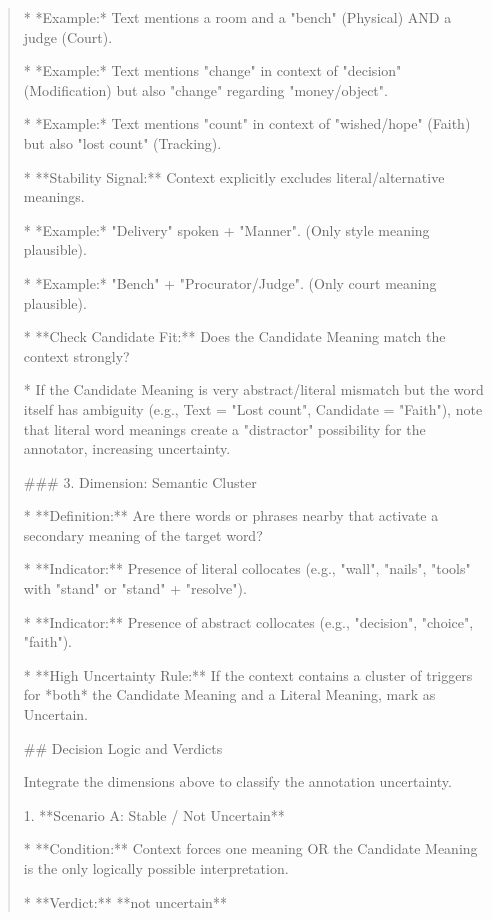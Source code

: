\begin{quote}
        *   *Example:* Text mentions a room and a "bench" (Physical) AND a judge (Court).

        *   *Example:* Text mentions "change" in context of "decision" (Modification) but also "change" regarding "money/object".

        *   *Example:* Text mentions "count" in context of "wished/hope" (Faith) but also "lost count" (Tracking).

    *   **Stability Signal:** Context explicitly excludes literal/alternative meanings.

        *   *Example:* "Delivery" spoken + "Manner". (Only style meaning plausible).

        *   *Example:* "Bench" + "Procurator/Judge". (Only court meaning plausible).

*   **Check Candidate Fit:** Does the Candidate Meaning match the context strongly?

    *   If the Candidate Meaning is very abstract/literal mismatch but the word itself has ambiguity (e.g., Text = "Lost count", Candidate = "Faith"), note that literal word meanings create a "distractor" possibility for the annotator, increasing uncertainty.



### 3. Dimension: Semantic Cluster

*   **Definition:** Are there words or phrases nearby that activate a secondary meaning of the target word?

*   **Indicator:** Presence of literal collocates (e.g., "wall", "nails", "tools" with "stand" or "stand" + "resolve").

*   **Indicator:** Presence of abstract collocates (e.g., "decision", "choice", "faith").

*   **High Uncertainty Rule:** If the context contains a cluster of triggers for *both* the Candidate Meaning and a Literal Meaning, mark as Uncertain.



## Decision Logic and Verdicts



Integrate the dimensions above to classify the annotation uncertainty.



1.  **Scenario A: Stable / Not Uncertain**

    *   **Condition:** Context forces one meaning OR the Candidate Meaning is the only logically possible interpretation.

    *   **Verdict:** **not uncertain**


\end{quote}

